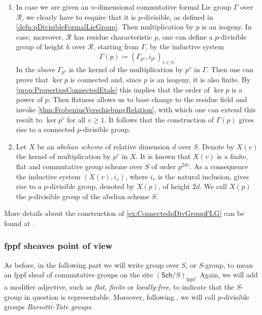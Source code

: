 \begin{ex}
\begin{enumerate}
\item In case we are given an $n$-dimensional commutative\label{ex:ConnectedpDivGroupFLG}
	formal Lie group $\Gamma$ over $\mathscr{R}$, we clearly have to require that it is $p$-divisible,
	as defined in \cref{defn:pDivisibleFormalLieGroup}.
	Then multiplication by $p$ is an isogeny.
	In case, moreover, $\mathscr{R}$ has residue characteristic $p$,
	one can define a $p$-divisible group of height $h$
	over $\mathscr{R}$, starting from $\Gamma$, by the inductive system
	\begin{equation*}
		\Gamma(p) \coloneqq \left(\Gamma_{p^v}, i_{p^v}\right)_{ v \in \mathbb{N} }
	.\end{equation*} 
	In the above $\Gamma_{p^v}$ is the kernel of
	the multiplication by $p^v$ in $\Gamma$.
	Then one can prove that $\ker p$ is connected and,
	since $p$ is an isogeny, it is also finite.
	By \cref{prop:PropertiesConnectedEtale} this implies that
	the order of $\ker p$ is a power of $p$.
	Then flatness allows us to base change to the residue field and invoke
	\cref{thm:FrobeniusVerschiebungRelation}, with which one can extend 
	this result to $\ker p^v$ for all $v \geq 1$.
	It follows that the construction of $\Gamma(p)$
	gives rise to a connected $p$-divisible group.

\item Let \(X\) be an \emph{abelian scheme} of relative dimension \(d\)
	over \(S\).
	Denote by \(X(v)\) the kernel of multiplication by \(p^v\)
	in \(X\).
	It is known that \(X(v)\) is a finite, flat and commutative
	group scheme over \(S\) of order \(p^{ 2dv }\).
	As a consequence the inductive system \(\left(X(v), i_v\right)\),
	where \(i_v\) is the natural inclusion, gives rise to
	a \(p\)-divisible group, denoted by \(X(p)\),
	of height \(2d\).
	We call \(X(p)\) the \(p\)-divisible group
	of the abelian scheme \(S\).
\end{enumerate}
\end{ex}


\begin{rem}[]
	More details about the construction of
	\cref{ex:ConnectedpDivGroupFLG} can be found at \cite[\S6]{Shatz}.
\end{rem}



\subsubsection{fppf sheaves point of view}
As before, in the following part we will write group over $S$, or $S$-group, to mean
an fppf sheaf of commutative groups on the site $(\mathsf{Sch}/S)_{\mathrm{fppf}}$.
Again, we will add a modifier adjective, such as \emph{flat, finite} or \emph{locally-free},
to indicate that the \(S\)-group in question is representable.
Moreover, following \cite{Messing}, we will call $p$-divisible groups
\emph{Barsotti-Tate groups}.



